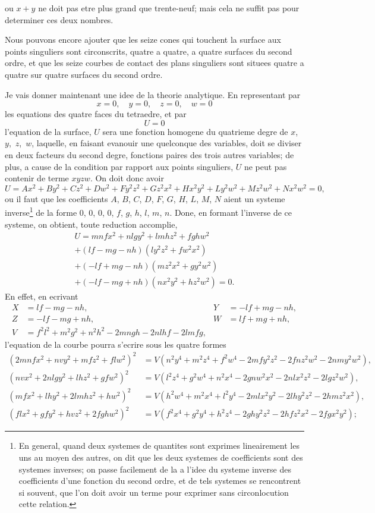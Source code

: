 \documentclass[11pt,a4paper]{book}
\begin{document}
\newpage
ou $x + y$ ne doit pas etre plus grand que trente-neuf; mais cela ne suffit pas pour determiner ces deux nombres.

Nous pouvons encore ajouter que les seize cones qui touchent la surface aux points singuliers sont circonscrits, quatre a quatre, a quatre surfaces du second ordre, et que les seize courbes de contact des plans singuliers sont situees quatre a quatre sur quatre surfaces du second ordre.

Je vais donner maintenant une idee de la theorie analytique. En representant par
\[
x = 0, \quad y = 0, \quad z = 0, \quad w = 0
\]
les equations des quatre faces du tetraedre, et par
\[
U = 0
\]
l'equation de la surface, $U$ sera une fonction homogene du quatrieme degre de $x$,~$y$,~$z$,~$w$, laquelle, en faisant evanouir une quelconque des variables, doit se diviser en deux facteurs du second degre, fonctions paires des trois autres variables; de plus, a cause de la condition par rapport aux points singuliers, $U$ ne peut pas contenir de terme $xyzw$. On doit donc avoir
\[
U = Ax^2 + By^2 + Cz^2 + Dw^2 + Fy^2z^2 + Gz^2x^2 + Hx^2y^2 + Ly^2w^2 + Mz^2w^2 + Nx^2w^2 = 0,
\]
ou il faut que les coefficients $A$, $B$, $C$, $D$, $F$, $G$, $H$, $L$, $M$, $N$ aient un systeme inverse\footnote{En general, quand deux systemes de quantites sont exprimes lineairement les uns au moyen des autres, on dit que les deux systemes de coefficients sont des systemes inverses; on passe facilement de la a l'idee du systeme inverse des coefficients d'une fonction du second ordre, et de tels systemes se rencontrent si souvent, que l'on doit avoir un terme pour exprimer sans circonlocution cette relation.} de la forme $0$, $0$, $0$, $0$, $f$, $g$, $h$, $l$, $m$, $n$. Done, en formant l'inverse de ce systeme, on obtient, toute reduction accomplie,
\begin{multline*}
U = mnfx^2 + nlgy^2 + lmhz^2 + fghw^2 \\
+ (lf-mg-nh)(ly^2z^2 + fw^2x^2) \\
+ (-lf+mg-nh)(mz^2x^2 + gy^2w^2) \\
+ (-lf-mg+nh)(nx^2y^2 + hz^2w^2) = 0.
\end{multline*}
En effet, en ecrivant
\begin{align*}
X &= lf-mg-nh, & Y &= -lf+mg-nh,\\
Z &= -lf-mg+nh, & W &= lf+mg+nh,\\
V &= f^2l^2 + m^2g^2 + n^2h^2 - 2mngh - 2nlhf - 2lmfg,
\end{align*}
l'equation de la courbe pourra s'ecrire sous les quatre formes
\begin{align*}
(2mnfx^2 + nvy^2 + mfz^2 + flw^2)^2 &= V(n^2y^4 + m^2z^4 + f^2w^4 - 2mfy^2z^2 - 2fnz^2w^2 - 2nmy^2w^2),\\
(nvx^2 + 2nlgy^2 + lhz^2 + gfw^2)^2 &= V(l^2z^4 + g^2w^4 + n^2x^4 - 2gnw^2x^2 - 2nlx^2z^2 - 2lgz^2w^2),\\
(mfx^2 + lhy^2 + 2lmhz^2 + hw^2)^2 &= V(h^2w^4 + m^2x^4 + l^2y^4 - 2mlx^2y^2 - 2lhy^2z^2 - 2hmz^2x^2),\\
(flx^2 + gfy^2 + hvz^2 + 2fghw^2)^2 &= V(f^2x^4 + g^2y^4 + h^2z^4 - 2ghy^2z^2 - 2hfz^2x^2 - 2fgx^2y^2);
\end{align*}
\end{document}

